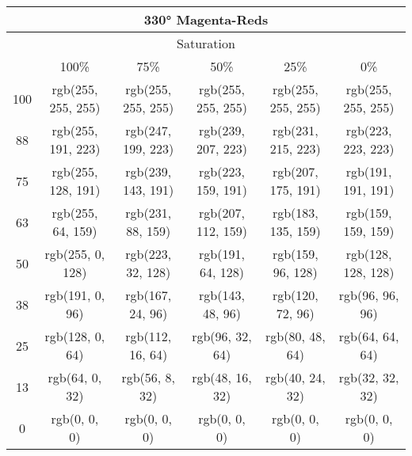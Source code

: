 \documentclass[a4j]{jarticle}
\begin{document}
\begin{tabular}{|c|c|c|c|c|c|}
\multicolumn{6}{|c|}{330°
 Magenta-Reds}\\\hline\multicolumn{6}{|c|}{Saturation}\\\hline&100\%&75\%&50\%&25\%&0\%\\\hline100&rgb(255,
     255, 255)&rgb(255, 255, 255)&rgb(255, 255, 255)&rgb(255, 255,
                 255)&rgb(255, 255, 255)\\\hline88&rgb(255, 191,
     223)&rgb(247, 199, 223)&rgb(239, 207, 223)&rgb(231, 215,
                 223)&rgb(223, 223, 223)\\\hline75&rgb(255, 128,
     191)&rgb(239, 143, 191)&rgb(223, 159, 191)&rgb(207, 175,
                 191)&rgb(191, 191, 191)\\\hline63&rgb(255, 64,
     159)&rgb(231, 88, 159)&rgb(207, 112, 159)&rgb(183, 135,
                 159)&rgb(159, 159, 159)\\\hline50&rgb(255, 0,
     128)&rgb(223, 32, 128)&rgb(191, 64, 128)&rgb(159, 96, 128)&rgb(128,
                     128, 128)\\\hline38&rgb(191, 0, 96)&rgb(167, 24,
         96)&rgb(143, 48, 96)&rgb(120, 72, 96)&rgb(96, 96,
                     96)\\\hline25&rgb(128, 0, 64)&rgb(112, 16,
         64)&rgb(96, 32, 64)&rgb(80, 48, 64)&rgb(64, 64,
                     64)\\\hline13&rgb(64, 0, 32)&rgb(56, 8, 32)&rgb(48,
             16, 32)&rgb(40, 24, 32)&rgb(32, 32, 32)\\\hline0&rgb(0, 0,
     0)&rgb(0, 0, 0)&rgb(0, 0, 0)&rgb(0, 0, 0)&rgb(0, 0, 0) 
\end{tabular}
\end{document}
